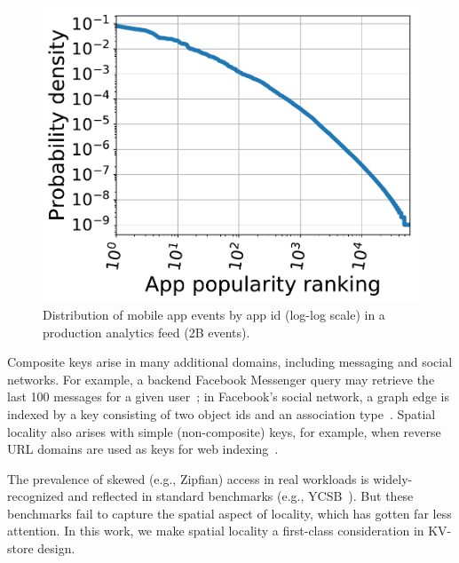 \documentclass[sigplan,10pt]{acmart}
\providecommand{\DIFadd}[1]{{\protect\color{blue}\uwave{#1}}} %
\providecommand{\DIFaddbegin}{} %
\providecommand{\DIFaddend}{} %
\begin{document}


\begin{figure}[tb]
\centering
\includegraphics[width=0.6\columnwidth]{figs/app_names_loglog_line.pdf}
\caption{{Distribution of mobile app events by app id (log-log scale) in a production analytics feed (2B events).}}
\label{fig:cdf}
\end{figure}

Composite keys arise in many additional domains, including messaging and social networks\DIFaddbegin \DIFadd{~\mbox{%
\cite{facebook-workloads}}\hspace{0pt}%
}\DIFaddend . 
For example, a backend Facebook Messenger query may retrieve the last 100 messages for a 
given user~\cite{Borthakur:2011:AHG:1989323.1989438}; %
in Facebook's social network, a graph edge is indexed by a key consisting of two 
object ids and an association type~\cite{Armstrong:2013:LDB:2463676.2465296}.
Spatial locality   also arises with simple (non-composite) keys, for example, when 
reverse  URL domains are used as keys for web  indexing~\cite{Cho:1998:ECT:297805.297835}. 

The prevalence of skewed (e.g., Zipfian)  access  in real workloads is widely-recognized 
and reflected in standard benchmarks (e.g., YCSB~\cite{YCSB}). %
But these benchmarks fail to capture the spatial aspect of locality, which has gotten far less attention.
In this work, we make spatial locality a first-class consideration in KV-store design.
\end{document}
